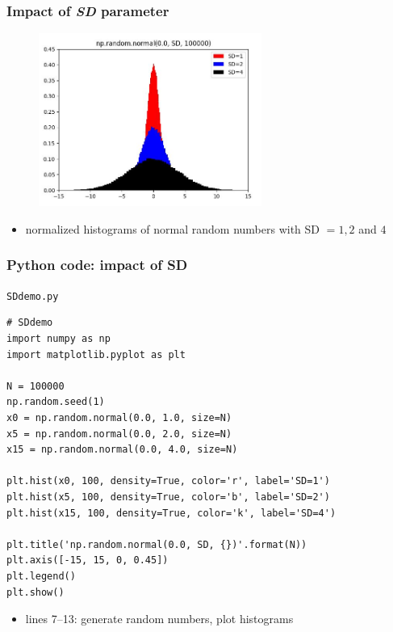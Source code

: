 \documentclass[english,14pt]{beamer}
\begin{document}

\begin{frame}[fragile]

\frametitle{Impact of \emph{SD} parameter}

\begin{figure}[ht]
	\centering
	\includegraphics[width=0.65\textwidth]{figures/SDdemoOutput}
\end{figure}

\vspace*{-5mm}

\begin{itemize}
	\item normalized histograms of normal random numbers with SD $=1, 2$ and $4$
\end{itemize}

\end{frame}


\begin{frame}[fragile]

\frametitle{Python code: impact of SD}

\vspace*{-3mm}

\texttt{SDdemo.py}
\vspace*{-1mm}
\begin{lstlisting}[style=CStyle,basicstyle=\scriptsize]
# SDdemo
import numpy as np
import matplotlib.pyplot as plt

N = 100000
np.random.seed(1)
x0 = np.random.normal(0.0, 1.0, size=N)
x5 = np.random.normal(0.0, 2.0, size=N)
x15 = np.random.normal(0.0, 4.0, size=N)

plt.hist(x0, 100, density=True, color='r', label='SD=1')
plt.hist(x5, 100, density=True, color='b', label='SD=2')
plt.hist(x15, 100, density=True, color='k', label='SD=4')

plt.title('np.random.normal(0.0, SD, {})'.format(N))
plt.axis([-15, 15, 0, 0.45])
plt.legend()
plt.show()
\end{lstlisting}

\vspace*{-2mm}

\begin{itemize}
	\item lines 7--13: generate random numbers, plot histograms
\end{itemize}

\end{frame}
\end{document}
